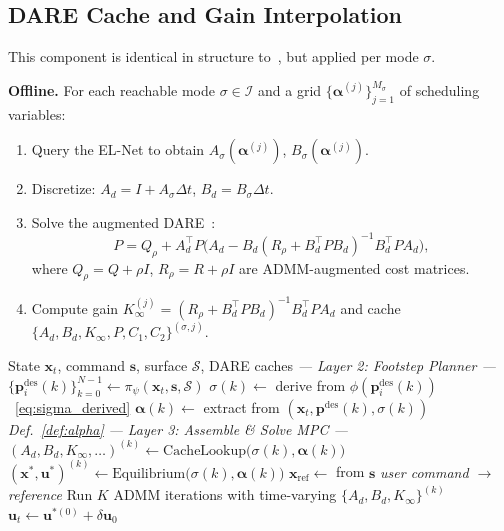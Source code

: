 \documentclass[letterpaper, 10pt, conference]{IEEEtran}
\newcommand{\balpha}{\bm{\alpha}}
\newcommand{\bx}{\bm{x}}
\newcommand{\bu}{\bm{u}}
\newcommand{\bp}{\bm{p}}
\newcommand{\cS}{\mathcal{S}}
\newcommand{\cI}{\mathcal{I}}
\begin{document}
\subsection{DARE Cache and Gain Interpolation}\label{sec:dare}

This component is identical in structure
to~\cite{zhang2025flat}, but applied per mode $\sigma$.

\textbf{Offline.}
For each reachable mode $\sigma \in \cI$ and a grid
$\{\balpha^{(j)}\}_{j=1}^{M_\sigma}$ of scheduling variables:
\begin{enumerate}
  \item Query the EL-Net to obtain
    $A_\sigma(\balpha^{(j)})$, $B_\sigma(\balpha^{(j)})$.
  \item Discretize: $A_d = I + A_\sigma \Delta t$,
    $B_d = B_\sigma \Delta t$.
  \item Solve the augmented DARE~\cite{tinympc}:
    \begin{equation}\label{eq:dare}
      P = Q_\rho + A_d^\top P \bigl(
        A_d - B_d (R_\rho + B_d^\top P B_d)^{-1}
        B_d^\top P A_d \bigr),
    \end{equation}
    where $Q_\rho = Q + \rho I$, $R_\rho = R + \rho I$
    are ADMM-augmented cost matrices.
  \item Compute gain $K_\infty^{(j)}
    = (R_\rho + B_d^\top P B_d)^{-1} B_d^\top P A_d$
    and cache $\{A_d, B_d, K_\infty, P, C_1, C_2\}^{(\sigma, j)}$.
\end{enumerate}

\begin{algorithm}[t]
\caption{Online: Assembled Switched LPV Template MPC}
\label{alg:online}
\begin{algorithmic}[1]
\REQUIRE State $\bx_t$, command $\bm{s}$, surface $\cS$,
  DARE caches
\STATE \textit{--- Layer 2: Footstep Planner ---}
\STATE $\{\bp^{\mathrm{des}}_i(k)\}_{k=0}^{N-1}
  \gets \pi_\psi(\bx_t, \bm{s}, \cS)$
  \STATE $\sigma(k) \gets$ derive
    from $\phi(\bp_i^{\mathrm{des}}(k))$~\eqref{eq:sigma_derived}
  \STATE $\balpha(k) \gets$ extract from
    $(\bx_t, \bp^{\mathrm{des}}(k), \sigma(k))$
    \hfill\textit{Def.~\ref{def:alpha}}
\ENDFOR
\STATE \textit{--- Layer 3: Assemble \& Solve MPC ---}
  \STATE $(A_d, B_d, K_\infty, \ldots)^{(k)} \gets
    \text{CacheLookup}\bigl(\sigma(k), \balpha(k)\bigr)$
  \STATE $(\bx^*, \bu^*)^{(k)} \gets
    \text{Equilibrium}\bigl(\sigma(k), \balpha(k)\bigr)$
\ENDFOR
\STATE $\bx_{\mathrm{ref}} \gets$ from $\bm{s}$
  \hfill\textit{user command $\to$ reference}
\STATE Run $K$ ADMM iterations with time-varying
  $\{A_d, B_d, K_\infty\}^{(k)}$
\STATE $\bu_t \gets \bu^{*(0)} + \delta \bu_0$
\end{algorithmic}
\end{algorithm}
\end{document}
